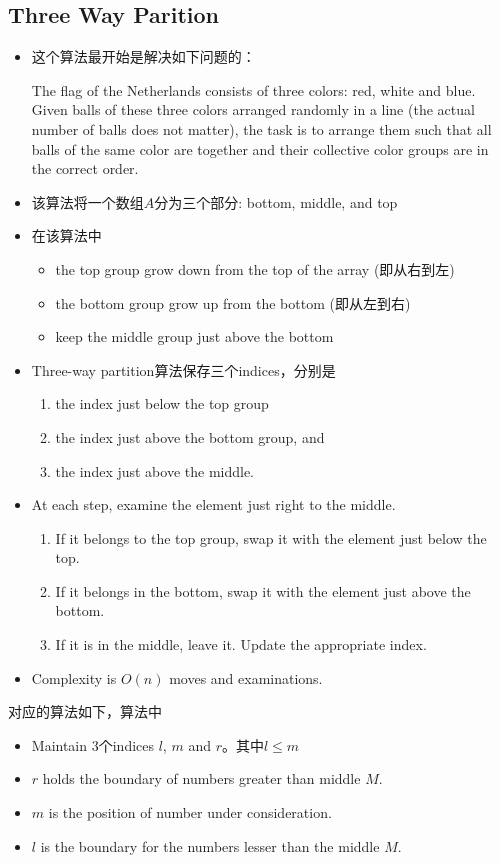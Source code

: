 \subsection{Three Way Parition}
\begin{itemize}
\item 这个算法最开始是解决如下问题的：
\par
The flag of the Netherlands consists of three colors: red, white and blue. Given balls of these three colors arranged randomly in a line (the actual number of balls does not matter), the task is to arrange them such that all balls of the same color are together and their collective color groups are in the correct order.
\item 该算法将一个数组$A$分为三个部分: bottom, middle, and top
\item 在该算法中
\begin{itemize}
\item the top group grow down from the top of the array (即从右到左)
\item the bottom group grow up from the bottom (即从左到右)
\item keep the middle group just above the bottom
\end{itemize}
\item Three-way partition算法保存三个indices，分别是
\begin{enumerate}
\item the index just below the top group
\item the index just above the bottom group, and
\item the index just above the middle.
\end{enumerate}
\item At each step, examine the element just right to the middle.
\begin{enumerate}
\item If it belongs to the top group, swap it with the element just below the top.
\item If it belongs in the bottom, swap it with the element just above the bottom.
\item If it is in the middle, leave it. Update the appropriate index. 
\end{enumerate}
\item Complexity is $ O(n) $ moves and examinations.
\end{itemize}
对应的算法如下，算法中
\begin{itemize}
\item Maintain 3个indices $l$, $ m $ and $ r $。其中$ l\leq m $
\item $r$ holds the boundary of numbers greater than middle $M$.
\item $m$ is the position of number under consideration.
\item $l$ is the boundary for the numbers lesser than the middle $M$.
\end{itemize}
